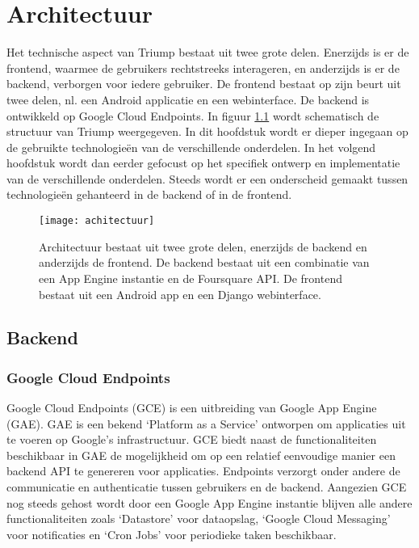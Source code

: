 
\chapter{Architectuur}

Het technische aspect van Triump bestaat uit twee grote delen. Enerzijds is er de frontend, waarmee de gebruikers rechtstreeks interageren, en anderzijds is er de backend, verborgen voor iedere gebruiker. De frontend bestaat op zijn beurt uit twee delen, nl. een Android applicatie en een webinterface. De backend is ontwikkeld op Google Cloud Endpoints. In figuur \ref{fig:algemene structuur} wordt schematisch de structuur van Triump weergegeven. In dit hoofdstuk wordt er dieper ingegaan op de gebruikte technologieën van de verschillende onderdelen. In het volgend hoofdstuk wordt dan eerder gefocust op het specifiek ontwerp en implementatie van de verschillende onderdelen. Steeds wordt er een onderscheid gemaakt tussen technologieën gehanteerd in de backend of in de frontend.

\begin{figure}[H]
	\centering
	\texttt{[image: achitectuur]}
	\caption{Architectuur bestaat uit twee grote delen, enerzijds de backend en anderzijds de frontend. De backend bestaat uit een combinatie van een App Engine instantie en de Foursquare API. De frontend bestaat uit een Android app en een Django webinterface.}
	\label{fig:algemene structuur}
	
\end{figure}

\section{Backend}

\subsection{Google Cloud Endpoints}
\label{sec: GCE}

Google Cloud Endpoints (GCE) is een uitbreiding van Google App Engine (GAE). GAE is een bekend `Platform as a Service' ontworpen om applicaties uit te voeren op Google's infrastructuur. GCE biedt naast de functionaliteiten beschikbaar in GAE de mogelijkheid om op een relatief eenvoudige manier een backend API te genereren voor applicaties.  Endpoints verzorgt onder andere de communicatie en authenticatie tussen gebruikers en de backend.
Aangezien GCE nog steeds gehost wordt door een Google App Engine instantie blijven alle andere functionaliteiten zoals `Datastore' voor dataopslag, `Google Cloud Messaging' voor notificaties en `Cron Jobs' voor periodieke taken beschikbaar.

